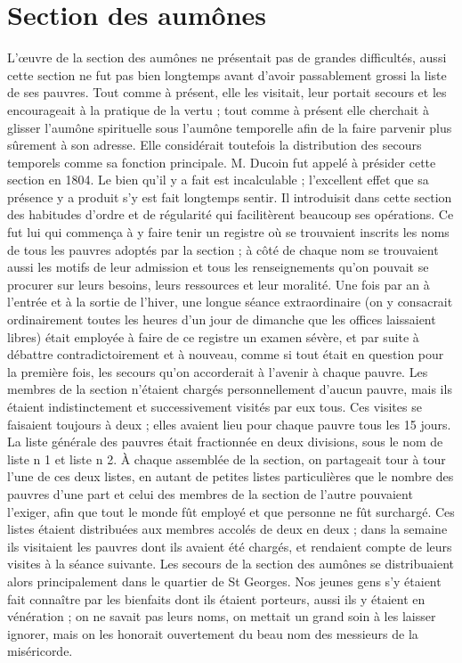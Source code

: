 \section*{Section des aumônes}
L'œuvre de la section des aumônes ne présentait pas de grandes difficultés, aussi cette section ne fut pas bien longtemps avant d'avoir passablement grossi la liste de ses pauvres. Tout comme à présent, elle les visitait, leur portait secours et les encourageait à la pratique de la vertu ; tout comme à présent elle cherchait à glisser l'aumône spirituelle sous l'aumône temporelle afin de la faire parvenir plus sûrement à son adresse. Elle considérait toutefois la distribution des secours
temporels comme sa fonction principale. M. Ducoin fut appelé à présider cette section en 1804. Le bien qu'il y a fait est incalculable ; l'excellent effet que sa présence y a produit s'y est fait longtemps sentir. Il introduisit dans cette section des habitudes d'ordre et de régularité qui facilitèrent beaucoup ses opérations. Ce fut lui qui commença à y faire tenir un registre où se trouvaient inscrits les noms de tous les pauvres adoptés par la section ; à côté de chaque nom se trouvaient aussi les motifs de leur admission et tous les renseignements qu'on pouvait se procurer sur leurs besoins, leurs ressources et leur moralité. Une fois par an à l'entrée et à la sortie de l'hiver, une longue séance extraordinaire (on y consacrait ordinairement toutes les heures d'un jour de dimanche que les offices laissaient libres) était employée à faire de ce registre un examen sévère, et par suite à débattre contradictoirement et à nouveau, comme si tout était en question pour la première fois, les secours qu'on accorderait à l'avenir à chaque pauvre. Les membres de la section n'étaient chargés personnellement d'aucun pauvre, mais ils étaient indistinctement et successivement visités par eux tous. Ces visites se faisaient toujours à deux ; elles avaient lieu pour chaque pauvre tous les 15 jours. La liste générale des pauvres était fractionnée en deux divisions, sous le nom de liste n 1 et liste n 2. À chaque assemblée de la section, on partageait tour à tour l'une de ces deux listes, en autant de petites listes particulières que le nombre des pauvres d'une part et celui des membres de la section de l'autre pouvaient l'exiger, afin que tout le monde fût employé et que personne ne fût surchargé. Ces listes étaient distribuées aux membres accolés de deux en deux ;
dans la semaine ils visitaient les pauvres dont ils avaient été chargés, et rendaient compte de leurs visites à la séance suivante. Les secours de la section des aumônes se distribuaient alors principalement dans le quartier de St Georges. Nos jeunes gens s'y étaient fait connaître par les bienfaits dont ils étaient porteurs, aussi ils y étaient en vénération ; on ne savait pas leurs noms, on mettait un grand soin à les laisser ignorer, mais on les honorait ouvertement du beau nom des messieurs de la miséricorde.

